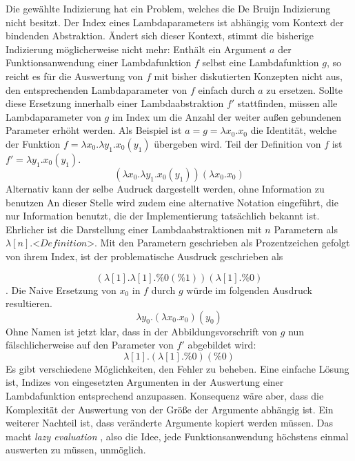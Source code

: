  Die gewählte Indizierung hat ein Problem, welches die De Bruijn Indizierung nicht besitzt. Der Index eines Lambdaparameters ist abhängig vom Kontext der bindenden Abstraktion. Ändert sich dieser Kontext, stimmt die bisherige Indizierung möglicherweise nicht mehr:
 Enthält ein Argument $a$ der Funktionsanwendung einer Lambdafunktion $f$ selbst eine Lambdafunktion $g$, so reicht es für die Auswertung von $f$ mit bisher diskutierten Konzepten nicht aus, den entsprechenden Lambdaparameter von $f$ einfach durch $a$ zu ersetzen. Sollte diese Ersetzung innerhalb einer Lambdaabstraktion $f'$ stattfinden, müssen alle Lambdaparameter von $g$ im Index um die Anzahl der weiter außen gebundenen Parameter erhöht werden. Als Beispiel ist $a = g = \lambda x_0 .x_0$ die Identität, welche der Funktion $f = \lambda x_0 .\lambda y_1 .x_0(y_1)$ übergeben wird. Teil der Definition von $f$ ist $f' = \lambda y_1 .x_0(y_1)$.
 $$(\lambda x_0 .\lambda y_1 .x_0(y_1))(\lambda x_0 .x_0)$$
 Alternativ kann der selbe Audruck dargestellt werden, ohne Information zu benutzen
 An dieser Stelle wird zudem eine alternative Notation eingeführt, die nur Information benutzt, die der Implementierung tatsächlich bekannt ist. Ehrlicher ist die Darstellung einer Lambdaabstraktionen mit $n$ Parametern als $\lambda [n] .\textit{<Definition>}$. Mit den Parametern geschrieben als Prozentzeichen gefolgt von ihrem Index, ist der problematische Ausdruck geschrieben als
 
 $$(\lambda [1] .\lambda [1] .\%0(\%1))(\lambda [1] .\%0)$$.
 Die Naive Ersetzung von $x_0$ in $f$ durch $g$ würde im folgenden Ausdruck resultieren.
 $$\lambda y_0 .(\lambda x_0 .x_0)(y_0)$$
 Ohne Namen ist jetzt klar, dass in der Abbildungsvorschrift von $g$ nun fälschlicherweise auf den Parameter von $f'$ abgebildet wird:
 $$\lambda [1] .(\lambda [1] .\%0)(\%0)$$
 Es gibt verschiedene Möglichkeiten, den Fehler zu beheben. Eine einfache Lösung ist, Indizes von eingesetzten Argumenten in der Auswertung einer Lambdafunktion entsprechend anzupassen. Konsequenz wäre aber, dass die Komplexität der Auswertung von der Größe der Argumente abhängig ist. Ein weiterer Nachteil ist, dass veränderte Argumente kopiert werden müssen. Das macht \textit{lazy evaluation} \cite{EvalStrategien}, also die Idee, jede Funktionsanwendung höchstens einmal auswerten zu müssen, unmöglich.
 
